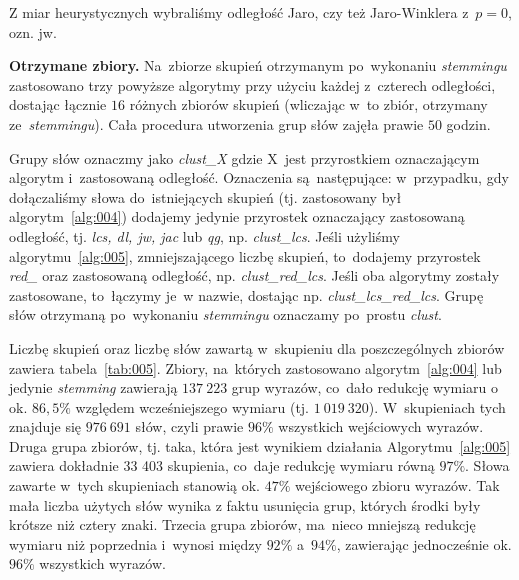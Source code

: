 \documentclass{praca1}
\begin{document}
Z miar heurystycznych wybraliśmy odległość Jaro, czy też Jaro-Winklera z~$p=0$, ozn. jw.

\textbf{Otrzymane zbiory.} Na~zbiorze skupień otrzymanym po~wykonaniu \emph{stemmingu} zastosowano trzy powyższe algorytmy przy użyciu każdej z~czterech odległości, dostając łącznie $16$ różnych zbiorów skupień (wliczając w~to zbiór, otrzymany ze~\emph{stemmingu}). Cała procedura utworzenia grup słów zajęła prawie $50$ godzin. 

Grupy słów oznaczmy jako \emph{clust\_X} gdzie X~jest przyrostkiem oznaczającym algorytm i~zastosowaną odległość. Oznaczenia są~następujące: w~przypadku, gdy dołączaliśmy słowa do~istniejących skupień (tj. zastosowany był algorytm~\ref{alg:004}) dodajemy jedynie przyrostek oznaczający zastosowaną odległość, tj. \emph{lcs, dl, jw, jac} lub \emph{qg}, np. \emph{clust\_lcs}. Jeśli użyliśmy algorytmu~\ref{alg:005}, zmniejszającego liczbę skupień, to~dodajemy przyrostek \emph{red\_} oraz zastosowaną odległość, np. \emph{clust\_red\_lcs}. Jeśli oba algorytmy zostały zastosowane, to~łączymy je~w nazwie, dostając np. \emph{clust\_lcs\_red\_lcs}. Grupę słów otrzymaną po~wykonaniu \emph{stemmingu} oznaczamy po~prostu \emph{clust}. 


Liczbę skupień oraz liczbę słów zawartą w~skupieniu dla poszczególnych zbiorów zawiera tabela~\ref{tab:005}. Zbiory, na~których zastosowano algorytm~\ref{alg:004} lub jedynie \emph{stemming} zawierają $137\ 223$ grup wyrazów, co~dało redukcję wymiaru o ok. $86,5\%$ względem wcześniejszego wymiaru (tj. $1\ 019\ 320$). W~skupieniach tych znajduje się $976\ 691$ słów, czyli prawie $96\%$  wszystkich wejściowych wyrazów. Druga grupa zbiorów, tj. taka, która jest wynikiem działania Algorytmu~\ref{alg:005} zawiera dokładnie 33 403 skupienia, co~daje redukcję wymiaru równą $97\%$. Słowa zawarte w~tych skupieniach stanowią ok. $47\%$ wejściowego zbioru wyrazów. Tak mała liczba użytych słów wynika z faktu usunięcia grup, których środki były krótsze niż cztery znaki. Trzecia grupa zbiorów, ma~nieco mniejszą redukcję wymiaru niż poprzednia i~wynosi między $92\%$ a~$94\%$, zawierając jednocześnie ok. $96\%$ wszystkich wyrazów.
\end{document}
